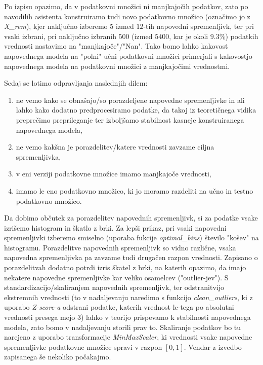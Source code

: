 \documentclass{article}
\begin{document}
Po izpisu opazimo, da v podatkovni množici ni manjkajočih podatkov, zato po navodilih asistenta konstruiramo tudi novo podatkovno množico (označimo jo z \textit{X\_rem}), kjer naključno izberemo $5$ izmed $12$-tih napovedni spremenljivk, ter pri vsaki izbrani, pri naključno izbranih $500$ (izmed $5400$, kar je okoli $9.3\%$) podatkih vrednosti nastavimo na "manjkajoče"/"Nan". 
Tako bomo lahko kakovost napovednega modela na "polni" učni podatkovni množici primerjali s kakovostjo napovednega modela na podatkovni množici z manjkajočimi vrednostmi. 

Sedaj se lotimo odpravljanja naslednjih dilem: 
\begin{enumerate}[itemsep=0.3ex]
    \item ne vemo kako se obnašajo/so porazdeljene napovedne spremenljivke in ali lahko kako dodatno predprocesiramo podatke, da takoj iz teoretičnega vidika preprečimo preprileganje ter izboljšamo stabilnost kasneje konstruiranega napovednega modela,
    \item ne vemo kakšna je porazdelitev/katere vrednosti zavzame ciljna spremenljivka,
    \item v eni verziji podatkovne množice imamo manjkajoče vrednosti,
    \item imamo le eno podatkovno množico, ki jo moramo razdeliti na učno in testno podatkovno množico.
\end{enumerate}

Da dobimo občutek za porazdelitev napovednih spremenljivk, si za podatke vsake izrišemo histogram in škatlo z brki. Za lepši prikaz, pri vsaki napovedni spremenljivki izberemo smiselno (uporaba fukcije \textit{optimal\_bins}) število "košev" na histogramu.
Porazdelitve napovednih spremenljivk so vidno različne, vsaka napovedna spremenljivka pa zavzame tudi drugačen razpon vrednosti.
Zapisano o porazdelitvah dodatno potrdi izris škatel z brki, na katerih opazimo, da imajo nekatere napovedne spremenljivke kar veliko osamelcev ("outlier-jev").
S standardizacijo/skaliranjem napovednih spremenljivk, ter odstranitvijo ekstremnih vrednosti (to v nadaljevanju naredimo s funkcijo \textit{clean\_outliers}, ki z uporabo \textit{Z-score-a} odstrani podatke, katerih vrednost le-tega po absolutni vrednosti presega mejo $3$) lahko v teorijo prispevamo k stabilnosti napovednega modela, zato bomo v nadaljevanju storili prav to.
Skaliranje podatkov bo tu narejeno z uporabo transformacije \textit{MinMaxScaler}, ki vrednosti vsake napovedne spremenljivke podatkovne množice spravi v razpon $[0, 1]$. 
Vendar z izvedbo zapisanega še nekoliko počakajmo. 
\end{document}

